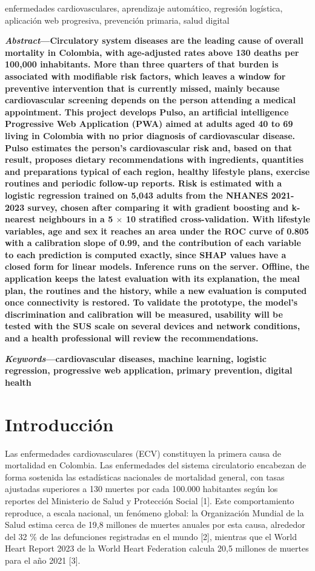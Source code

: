 \documentclass[conference]{IEEEtran}
\begin{document}
\renewcommand{\IEEEkeywordsname}{Palabras clave}
\begin{IEEEkeywords}
enfermedades cardiovasculares, aprendizaje automático, regresión logística, aplicación web progresiva, prevención primaria, salud digital
\end{IEEEkeywords}
\noindent\textbf{\textit{Abstract}---Circulatory system diseases are the leading cause of overall mortality in Colombia, with age-adjusted rates above 130 deaths per 100{,}000 inhabitants. More than three quarters of that burden is associated with modifiable risk factors, which leaves a window for preventive intervention that is currently missed, mainly because cardiovascular screening depends on the person attending a medical appointment. This project develops Pulso, an artificial intelligence Progressive Web Application (PWA) aimed at adults aged 40 to 69 living in Colombia with no prior diagnosis of cardiovascular disease. Pulso estimates the person's cardiovascular risk and, based on that result, proposes dietary recommendations with ingredients, quantities and preparations typical of each region, healthy lifestyle plans, exercise routines and periodic follow-up reports. Risk is estimated with a logistic regression trained on 5{,}043 adults from the NHANES 2021-2023 survey, chosen after comparing it with gradient boosting and k-nearest neighbours in a 5 $\times$ 10 stratified cross-validation. With lifestyle variables, age and sex it reaches an area under the ROC curve of 0.805 with a calibration slope of 0.99, and the contribution of each variable to each prediction is computed exactly, since SHAP values have a closed form for linear models. Inference runs on the server. Offline, the application keeps the latest evaluation with its explanation, the meal plan, the routines and the history, while a new evaluation is computed once connectivity is restored. To validate the prototype, the model's discrimination and calibration will be measured, usability will be tested with the SUS scale on several devices and network conditions, and a health professional will review the recommendations.}

\noindent\textbf{\textit{Keywords}---cardiovascular diseases, machine learning, logistic regression, progressive web application, primary prevention, digital health}

\section{Introducción}
Las enfermedades cardiovasculares (ECV) constituyen la primera causa de mortalidad en Colombia. Las enfermedades del sistema circulatorio encabezan de forma sostenida las estadísticas nacionales de mortalidad general, con tasas ajustadas superiores a 130 muertes por cada 100.000 habitantes según los reportes del Ministerio de Salud y Protección Social [1]. Este comportamiento reproduce, a escala nacional, un fenómeno global: la Organización Mundial de la Salud estima cerca de 19{,}8 millones de muertes anuales por esta causa, alrededor del 32 \% de las defunciones registradas en el mundo [2], mientras que el World Heart Report 2023 de la World Heart Federation calcula 20{,}5 millones de muertes para el año 2021 [3].
\end{document}
